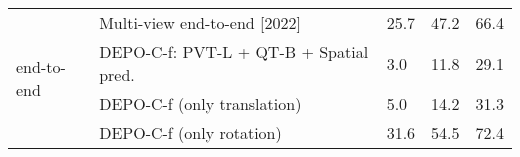 \begin{table}[h!]
\begin{tabular}{lllll}
\cline{1-5}
\multirow[c]{4}{*}{end-to-end} & Multi-view end-to-end [2022] \cite{roessle2022end2end} & {\cellcolor[HTML]{69BE63}} \color[HTML]{F1F1F1} 25.7 & {\cellcolor[HTML]{4BB05C}} \color[HTML]{F1F1F1} 47.2 & {\cellcolor[HTML]{219C52}} \color[HTML]{F1F1F1} 66.4 \\
 & DEPO-C-f: PVT-L + QT-B + Spatial pred. & {\cellcolor[HTML]{A50026}} \color[HTML]{F1F1F1} 3.0 & {\cellcolor[HTML]{B91326}} \color[HTML]{F1F1F1} 11.8 & {\cellcolor[HTML]{F16640}} \color[HTML]{F1F1F1} 29.1 \\
 & DEPO-C-f (only translation) & {\cellcolor[HTML]{C82227}} \color[HTML]{F1F1F1} 5.0 & {\cellcolor[HTML]{D42D27}} \color[HTML]{F1F1F1} 14.2 & {\cellcolor[HTML]{F7814C}} \color[HTML]{F1F1F1} 31.3 \\
 & DEPO-C-f (only rotation) & {\cellcolor[HTML]{006837}} \color[HTML]{F1F1F1} 31.6 & {\cellcolor[HTML]{006837}} \color[HTML]{F1F1F1} 54.5 & {\cellcolor[HTML]{006837}} \color[HTML]{F1F1F1} 72.4 \\
\cline{1-5}
\bottomrule
\end{tabular}
\end{table}
